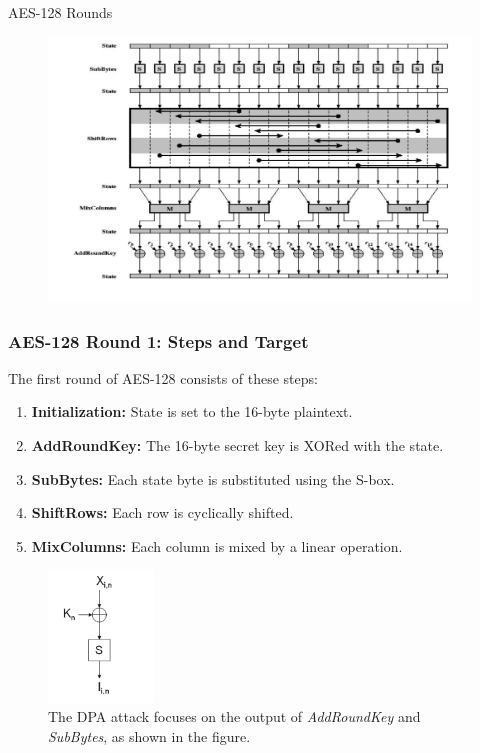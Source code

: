 \begin{frame}{AES-128 Rounds}
     \begin{figure}
    
        \includegraphics[width=1\textwidth]{main thing/Pictures/aes-round-l.jpg}
        
    \end{figure}
\end{frame}


\begin{frame}
    \frametitle{AES-128 Round 1: Steps and Target}

    The first round of AES-128 consists of these steps:
    \begin{enumerate}
        \item \textbf{Initialization:} State is set to the 16-byte plaintext.
        \item \textbf{AddRoundKey:} The 16-byte secret key is XORed with the state.
        \item \textbf{SubBytes:} Each state byte is substituted using the S-box.
        \item \textbf{ShiftRows:} Each row is cyclically shifted.
        \item \textbf{MixColumns:} Each column is mixed by a linear operation.
    \end{enumerate}

    \begin{figure}
        \centering
        \includegraphics[width=0.25\textwidth]{main thing/Pictures/AddRoundKey_SBox_Diagram.png}
        \caption{The DPA attack focuses on the output of \textit{AddRoundKey} and \textit{SubBytes}, as shown in the figure.}
    \end{figure}
    
\end{frame}


